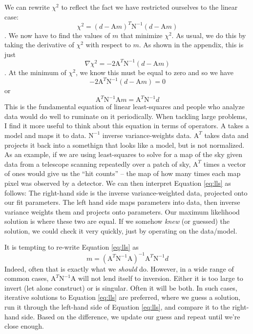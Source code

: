\documentclass[letterpaper,11pt,preprint]{aastex}
\begin{document}
{We can rewrite $\chi^2$ to reflect the fact we have restricted
ourselves to the linear case:
\begin{equation}\label{eq:chisq}\chi^2=(d-\mathrm{A}m)^T \mathrm{N}^{-1} (d-\mathrm{A}m)\end{equation}
.  We now have to find the values of $m$ that minimize $\chi^2$.  As
usual, we do this by taking the derivative of $\chi^2$ with respect to
$m$.  As shown in the appendix, this is just 
$$\nabla \chi^2=-2\mathrm{A}^T \mathrm{N}^{-1}(d-\mathrm{A}m)$$
.  At the minimum of $\chi^2$, we know this must be equal to zero and
so we have 
$$-2\mathrm{A}^T \mathrm{N}^{-1}(d-\mathrm{A}m)=0$$
or
\begin{equation}\label{eq:lls} \mathrm{A}^T \mathrm{N}^{-1}\mathrm{A}m=\mathrm{A}^T
\mathrm{N}^{-1}d
\end{equation}
This is the fundamental equation of linear least-squares and people
who analyze data would do well to ruminate on it periodically.  When
tackling large problems, I find it more useful to think about this
equation in terms of operators.  $\mathrm{A}$ takes a model and maps
it to data.  $\mathrm{N}^{-1}$ inverse variance-weights data.
$\mathrm{A}^T$ takes data and projects it back into a somethign that
looks like a model, but is not normalized.  As an example, if we are
using least-squares to solve for a map of the sky given data from a
telescope scanning repeatedly over a patch of sky, $\mathrm{A}^T$
times a vector of ones would give us the ``hit counts'' -- the map of
how many times each map pixel was observed by a detector.  We can then
interpret Equation \ref{eq:lls} as follows:  The right-hand side is
the inverse variance-weighted data, projected onto our fit
parameters.  The left hand side maps parameters into data, then
inverse variance weights them and projects onto parameters.  Our
maximum likelihood solution is where these two are equal.  If we
somehow {\textit{knew}} (or guessed) the solution, we could check it
very quickly, just by operating on the data/model. 

It is tempting to re-write Equation \ref{eq:lls} as 
$$m= \left (\mathrm{A}^T \mathrm{N}^{-1}\mathrm{A} \right ) ^{-1}
\mathrm{A}^T \mathrm{N}^{-1}d $$
Indeed, often that is exactly what we {\textit{should}} do.  However,
in a wide range of common cases, $\mathrm{A}^T
\mathrm{N}^{-1}\mathrm{A}$ will not lend itself to inversion.  Either
it is too large to invert (let alone construct) or is singular.  Often
it will be both.  In such cases, iterative solutions to Equation
\ref{eq:lls} are preferred, where we guess a solution, run it through
the left-hand side of Equation \ref{eq:lls}, and compare it to the
right-hand side.  Based on the difference, we update our guess and
repeat until we're close enough.  

}
\end{document}
